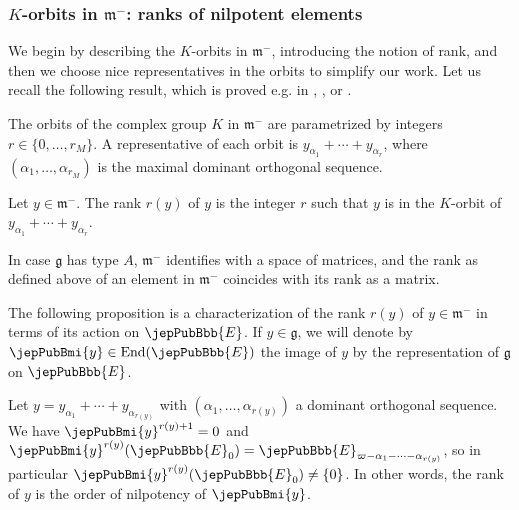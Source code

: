 \subsubsection{$K$-orbits in $\mathfrak m^-$: ranks of nilpotent elements}
We begin by describing the $K$-orbits in $\mathfrak m^-$, introducing the notion of rank, and then we choose nice representatives in the orbits to simplify our work. Let us recall the following result, which is proved e.g. in \cite{jep93HC56}, \cite[Ch.~VIII, \S7]{jep93Hel01}, or \cite{jep93Wol72}.
\begin{proposition}
The orbits of the complex group $K$ in $\mathfrak m^-$ are parametrized by integers $r\in\{0,\ldots,r_M\}$. A representative of each orbit is $y_{\alpha_1}+\cdots+y_{\alpha_r}$, where $(\alpha_1,\ldots,\alpha_{r_M})$ is the maximal dominant orthogonal sequence.
\end{proposition}
\begin{definition}
Let $y\in\mathfrak m^-$. The rank $r(y)$ of $y$ is the integer $r$ such that $y$ is in the $K$-orbit of $y_{\alpha_1}+\cdots+y_{\alpha_r}$.
\end{definition}
\begin{example}
In case $\mathfrak g$ has type $A$, $\mathfrak m^-$ identifies with a space of matrices, and the rank as defined above of an element in $\mathfrak m^-$ coincides with its rank as a matrix.
\end{example}
The following proposition is a characterization of the rank $r(y)$ of $y\in\mathfrak m^-$ in terms of its action on $\jepPubBbb{E}$. If $y\in\mathfrak g$, we will denote by $\jepPubBmi{y}\in\operatorname{End}(\jepPubBbb{E})$ the image of $y$ by the representation of $\mathfrak g$ on $\jepPubBbb{E}$.
\begin{proposition}
Let $y=y_{\alpha_1}+\cdots+y_{\alpha_{r(y)}}$ with $(\alpha_1,\ldots,\alpha_{r(y)})$ a dominant orthogonal sequence. We have $\jepPubBmi{y}^{r(y)+1}=0$ and $\jepPubBmi{y}^{r(y)}(\jepPubBbb{E}_0)=\jepPubBbb{E}_{\varpi-\alpha_1-\cdots-\alpha_{r(y)}}$, so in particular $\jepPubBmi{y}^{r(y)}(\jepPubBbb{E}_0)\neq\{0\}$. In other words, the rank of $y$ is the order of nilpotency of $\jepPubBmi{y}$.
\end{proposition}
